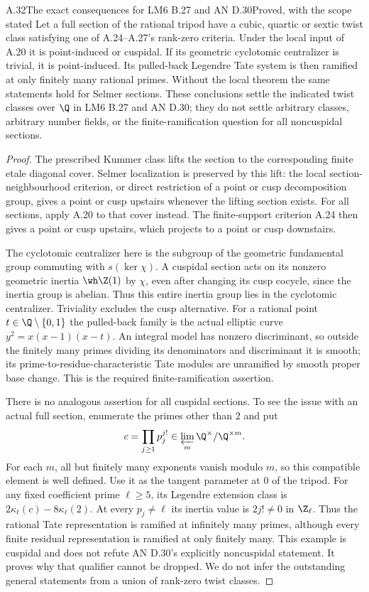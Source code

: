 \begin{statement}{A.32}{The exact consequences for LM6 B.27 and AN D.30}{Proved, with the scope stated}
Let a full section of the rational tripod have a cubic, quartic or sextic twist class satisfying one of A.24--A.27's rank-zero criteria. Under the local input of A.20 it is point-induced or cuspidal. If its geometric cyclotomic centralizer is trivial, it is point-induced. Its pulled-back Legendre Tate system is then ramified at only finitely many rational primes. Without the local theorem the same statements hold for Selmer sections. These conclusions settle the indicated twist classes over $\Q$ in LM6 B.27 and AN D.30; they do not settle arbitrary classes, arbitrary number fields, or the finite-ramification question for all noncuspidal sections.
\end{statement}
\begin{proof}
The prescribed Kummer class lifts the section to the corresponding finite etale diagonal cover. Selmer localization is preserved by this lift: the local section-neighbourhood criterion, or direct restriction of a point or cusp decomposition group, gives a point or cusp upstairs whenever the lifting section exists. For all sections, apply A.20 to that cover instead. The finite-support criterion A.24 then gives a point or cusp upstairs, which projects to a point or cusp downstairs.

The cyclotomic centralizer here is the subgroup of the geometric fundamental group commuting with $s(\ker\chi)$. A cuspidal section acts on its nonzero geometric inertia $\wh\Z(1)$ by $\chi$, even after changing its cusp cocycle, since the inertia group is abelian. Thus this entire inertia group lies in the cyclotomic centralizer. Triviality excludes the cusp alternative. For a rational point $t\in\Q\setminus\{0,1\}$ the pulled-back family is the actual elliptic curve $y^2=x(x-1)(x-t)$. An integral model has nonzero discriminant, so outside the finitely many primes dividing its denominators and discriminant it is smooth; its prime-to-residue-characteristic Tate modules are unramified by smooth proper base change. This is the required finite-ramification assertion.

There is no analogous assertion for all cuspidal sections. To see the issue with an actual full section, enumerate the primes other than $2$ and put
\[
c=\prod_{j\ge1}p_j^{j!}\in\varprojlim_m\Q^\times/\Q^{\times m}.
\]
For each $m$, all but finitely many exponents vanish modulo $m$, so this compatible element is well defined. Use it as the tangent parameter at $0$ of the tripod. For any fixed coefficient prime $\ell\ge5$, its Legendre extension class is $2\kappa_\ell(c)-8\kappa_\ell(2)$. At every $p_j\ne\ell$ its inertia value is $2j!\ne0$ in $\Z_\ell$. Thus the rational Tate representation is ramified at infinitely many primes, although every finite residual representation is ramified at only finitely many. This example is cuspidal and does not refute AN D.30's explicitly noncuspidal statement. It proves why that qualifier cannot be dropped. We do not infer the outstanding general statements from a union of rank-zero twist classes.
\end{proof}
